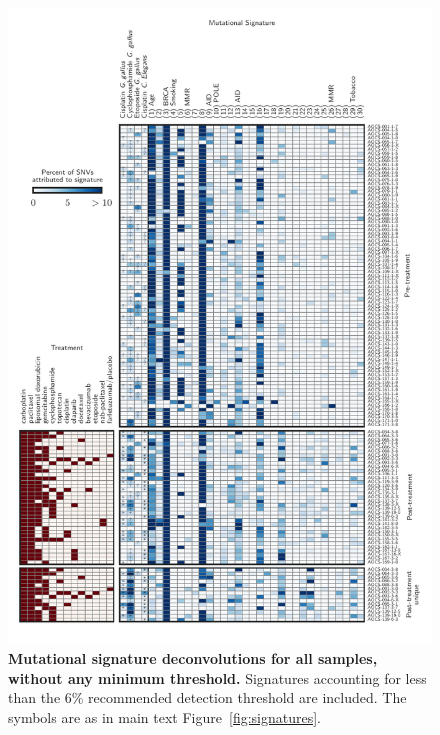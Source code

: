 \begin{figure}
\centering
\includegraphics[scale=1.0]{figures/supplementary_signatures_no_cutoff.pdf}
\caption{\textbf{Mutational signature deconvolutions for all samples, without any minimum threshold.} Signatures accounting for less than the 6\% recommended detection threshold are included. The symbols are as in main text Figure~\ref{fig:signatures}.}
\label{fig:supplementary_signatures_no_cutoff.pdf}
\end{figure}

\FloatBarrier
